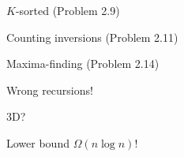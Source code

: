\begin{frame}{$K$-sorted (Problem 2.9)}
\end{frame}
\begin{frame}{Counting inversions (Problem 2.11)}
\end{frame}
\begin{frame}{Maxima-finding (Problem 2.14)}
  \centerline{Wrong recursions!}
  \pause
  \vspace{0.30cm}

  \centerline{3D?}
  \pause
  \vspace{0.30cm}

  \centerline{Lower bound $\Omega(n \log n)$!}
\end{frame}
